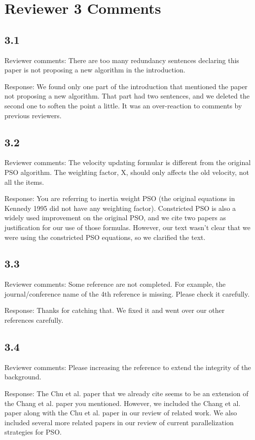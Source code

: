\documentclass[onecolumn, 12pt]{article}
\begin{document}
\section*{Reviewer 3 Comments}

\subsection*{3.1}

Reviewer comments: There are too many redundancy sentences declaring this paper
is not proposing a new algorithm in the introduction.

Response: We found only one part of the introduction that mentioned the paper
not proposing a new algorithm.  That part had two sentences, and we deleted the
second one to soften the point a little.  It was an over-reaction to comments
by previous reviewers.

\subsection*{3.2}

Reviewer comments: The velocity updating formular is different from the
original PSO algorithm.  The weighting factor, X, should only affects the old
velocity, not all the items.

Response: You are referring to inertia weight PSO (the original equations in
Kennedy 1995 did not have any weighting factor).  Constricted PSO is also a
widely used improvement on the original PSO, and we cite two papers as
justification for our use of those formulas.  However, our text wasn't clear
that we were using the constricted PSO equations, so we clarified the text.

\subsection*{3.3}

Reviewer comments: Some reference are not completed. For example, the
journal/conference name of the 4th reference is missing. Please check it
carefully.

Response: Thanks for catching that.  We fixed it and went over our other
references carefully.

\subsection*{3.4}

Reviewer comments: Please increasing the reference to extend the integrity of
the background.

Response: The Chu et al. paper that we already cite seems to be an extension of
the Chang et al. paper you mentioned.  However, we included the Chang et al.
paper along with the Chu et al. paper in our review of related work.  We also
included several more related papers in our review of current parallelization
strategies for PSO.
\end{document}
